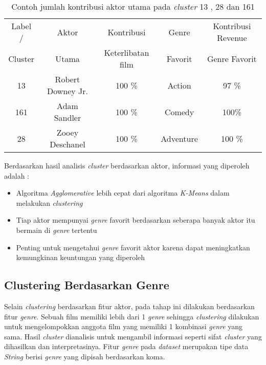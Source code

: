 \begin{table}[H]
\centering
\caption{Contoh jumlah kontribusi aktor utama pada \textit{cluster} 13 , 28 dan 161 }
\begin{tabular}{|c|c|c|c|c|}
\hline 
Label / & Aktor  & Kontribusi  & Genre & Kontribusi Revenue \\ 

Cluster & Utama & Keterlibatan film & Favorit & Genre Favorit \\ 
\hline 
13 & Robert Downey Jr. & 100 \% & Action & 97 \% \\ 
\hline 
161 & Adam Sandler & 100 \% & Comedy & 100\% \\ 
\hline 
28 & Zooey Deschanel & 100 \% & Adventure & 100 \% \\ 
\hline 
\end{tabular} 
\label{tab:contohkontribusi_clusteractor}
\end{table}



Berdasarkan hasil analisis \textit{cluster} berdasarkan aktor, informasi yang diperoleh adalah  :

\begin{itemize}
\item Algoritma \textit{Agglomerative} lebih cepat dari algoritma \textit{K-Means} dalam melakukan \textit{clustering}

\item Tiap aktor mempunyai \textit{genre} favorit berdasarkan seberapa banyak aktor itu bermain di \textit{genre} tertentu 

\item Penting untuk mengetahui \textit{genre} favorit aktor karena dapat meningkatkan kemungkinan keuntungan yang diperoleh

\end{itemize}



\subsection{Clustering Berdasarkan Genre}
Selain \textit{clustering} berdasarkan fitur aktor, pada tahap ini dilakukan berdasarkan fitur \textit{genre}. Sebuah film memiliki lebih dari 1 \textit{genre}  sehingga \textit{clustering} dilakukan untuk mengelompokkan anggota film yang memiliki 1 kombinasi \textit{genre} yang sama. Hasil \textit{cluster} dianalisis untuk mengambil informasi seperti sifat \textit{cluster} yang dihasilkan dan interpretasinya. Fitur \textit{genre} pada \textit{dataset} merupakan tipe data \textit{String} berisi \textit{genre} yang dipisah berdasarkan koma.

